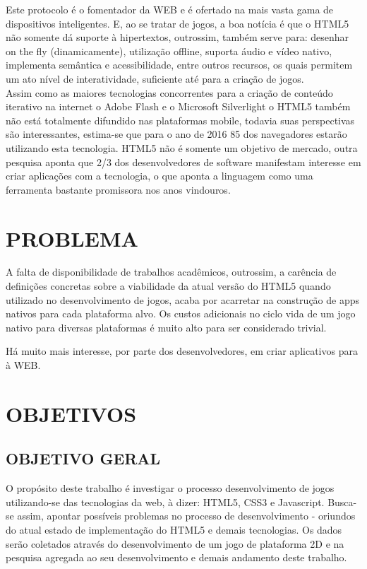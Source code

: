 \documentclass{article}
\begin{document}
Este protocolo é o fomentador da WEB e é ofertado na mais vasta gama de dispositivos inteligentes. E, ao se tratar de jogos, a boa notícia é que o HTML5 não somente dá suporte à hipertextos, outrossim, também serve para: desenhar on the fly (dinamicamente), utilização offline, suporta  áudio e vídeo nativo, implementa semântica e acessibilidade, entre outros recursos, os quais permitem um ato nível de interatividade, suficiente até para a criação de jogos.
\\
	Assim como as  maiores tecnologias concorrentes para a criação de conteúdo iterativo na internet o Adobe Flash e o Microsoft Silverlight o HTML5 também não está totalmente difundido nas plataformas mobile, todavia suas perspectivas são interessantes, estima-se que para o ano de 2016 85 dos navegadores estarão utilizando esta tecnologia. HTML5 não é somente um objetivo de mercado, outra pesquisa aponta que 2/3 dos desenvolvedores de software manifestam interesse em criar aplicações com a tecnologia, o que aponta a linguagem como uma ferramenta bastante promissora nos anos vindouros.


\section{PROBLEMA}

A falta de disponibilidade de trabalhos acadêmicos, outrossim, a carência de definições concretas sobre a viabilidade da atual versão do HTML5 quando utilizado no desenvolvimento de jogos, acaba por acarretar na construção de apps nativos para cada plataforma alvo. Os custos adicionais no ciclo vida de um jogo nativo para diversas plataformas é muito alto para ser considerado trivial.

Há muito mais interesse, por parte dos desenvolvedores, em criar aplicativos para à WEB.


\section{OBJETIVOS}
\subsection{OBJETIVO GERAL}

O propósito deste trabalho é investigar o processo desenvolvimento de jogos utilizando-se das tecnologias da web, à dizer: HTML5, CSS3 e Javascript. Busca-se assim, apontar possíveis problemas no processo de desenvolvimento - oriundos do atual estado de implementação do HTML5  e demais tecnologias. Os dados serão coletados através do desenvolvimento de um jogo de plataforma 2D e na pesquisa agregada ao seu desenvolvimento e demais andamento deste trabalho.
\end{document}
